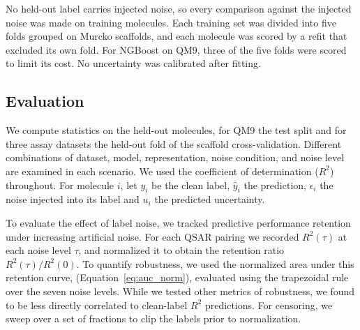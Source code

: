 No held-out label carries injected noise, so every comparison against the injected noise was made on
training molecules. Each training set was divided into five folds grouped on Murcko scaffolds, and each
molecule was scored by a refit that excluded its own fold. For NGBoost on QM9, three of the five folds
were scored to limit its cost. No uncertainty was calibrated after fitting.


\subsection{Evaluation}
We compute statistics on the held-out molecules, for QM9 the test split and for three assay datasets the held-out fold of the scaffold cross-validation. Different combinations of dataset, model, representation, noise condition, and noise level are examined in each scenario. We used the coefficient of determination ($R^2$) throughout. For molecule $i$, let $y_i$ be the clean label, $\hat{y}_i$ the prediction, $\epsilon_i$ the noise injected into its label and $u_i$ the predicted uncertainty.

To evaluate the effect of label noise, we tracked predictive performance retention under increasing artificial noise. For each QSAR pairing we recorded $R^2(\tau)$ at each noise level $\tau$, and normalized it to obtain the retention ratio $R^2(\tau)/R^2(0)$. To quantify robustness, we used the normalized area under this retention curve, \aucnorm (Equation~\ref{eq:auc_norm}), evaluated using the trapezoidal rule over the seven noise levels. While we tested other metrics of robustness, we found \aucnorm to be less directly correlated to clean-label $R^2$ predictions. For censoring, we sweep over a set of fractions to clip the labels prior to normalization. 

